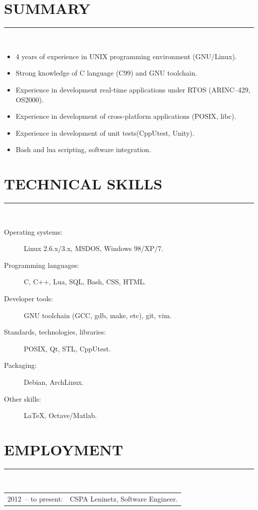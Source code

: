 \documentclass[a4paper,oneside,12pt]{article}
\newcommand{\cvpart}[1]{%
\vspace{-0.9em}%
\section*{\Large\bfseries\MakeTextUppercase{#1}}%
\vspace{-1.7em}%
\rule{\linewidth}{0.3em}\\[-0.8em]%
}
\begin{document}
\cvpart{Summary}
\begin{itemize}
\item 4 years of experience in UNIX programming environment (GNU/Linux).
\item Strong knowledge of C language (C99) and GNU toolchain.
\item Experience in development real-time applications under RTOS (ARINC--429, OS2000).
\item Experience in development of cross-platform applications (POSIX, libc).
\item Experience in development of unit tests(CppUtest, Unity).
\item Bash and lua scripting, software integration.
\end{itemize}


\cvpart{Technical skills}
\begin{description}
\item[Operating systems:] Linux 2.6.x/3.x, MSDOS, Windows 98/XP/7.
\item[Programming languages:] C, C++, Lua, SQL, Bash, CSS, HTML. 
\item[Developer tools:] GNU toolchain (GCC, gdb, make, etc), git, vim.
\item[Standards, technologies, libraries:] POSIX, Qt, STL, CppUtest. 
\item[Packaging:] Debian, ArchLinux.
\item[Other skills:]  LaTeX, Octave/Matlab.
\end{description}


\cvpart{Employment}

\begin{tabularx}{\linewidth}{lX}
2012~-- to present:& CSPA Leninetz, Software Engineer.\\
\end{tabularx}

\pagebreak
\end{document}
